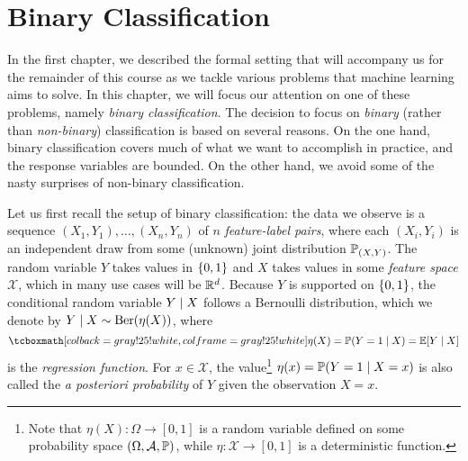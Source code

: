 \chapter{Binary Classification}
\label{ch: binary classification}

In the first chapter, we described the formal setting that will accompany us for the remainder of this course as we tackle various problems that machine learning aims to solve. In this chapter, we will focus our attention on one of these problems, namely \emph{binary classification}. The decision to focus on \emph{binary} (rather than \emph{non-binary}) classification is based on several reasons. On the one hand, binary classification covers much of what we want to accomplish in practice, and the response variables are bounded. On the other hand, we avoid some of the nasty surprises of non-binary classification.

Let us first recall the setup of binary classification: the data we observe is a sequence $(X_1, Y_1), \dots, (X_n, Y_n)$ of $n$ \emph{feature-label pairs}, where each $(X_i, Y_i)$ is an independent draw from some (unknown) joint distribution $\P_{(X, Y)}$. The random variable $Y$ takes values in $\set{0, 1}$ and $X$ takes values in some \emph{feature space} $\mathcal{X}$, which in many use cases will be $\R^d$. Because $Y$ is supported on $\set{0, 1}$, the conditional random variable $Y \given X$ follows a Bernoulli distribution, which we denote by $Y \given X \sim \Ber(\eta(X))$, where
\[
    \highlightMath{
        \eta(X) = \Prob(Y = 1 \given X) = \Exp[Y \given X]
    }
\]
is the \emph{regression function}. For $x \in \mathcal{X}$, the value\footnote{Note that $\eta(X) \colon \Omega \to [0, 1]$ is a random variable defined on some probability space $(\Omega, \mathcal{A}, \P)$, while $\eta \colon \mathcal{X} \to [0, 1]$ is a deterministic function.} $\eta(x) = \Prob(Y = 1 \given X = x)$ is also called the \emph{a posteriori probability} of $Y$ given the observation $X = x$.
